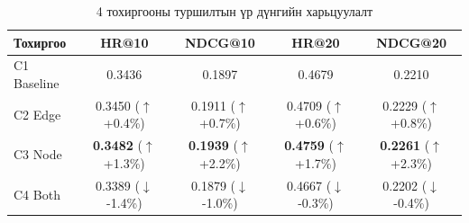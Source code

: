 \begin{table}[h]
\centering
\caption{4 тохиргооны туршилтын үр дүнгийн харьцуулалт}
\label{tab:results}
\begin{tabular}{lcccc}
\toprule
\textbf{Тохиргоо} & \textbf{HR@10} & \textbf{NDCG@10} & \textbf{HR@20} & \textbf{NDCG@20} \\
\midrule
C1 Baseline & 0.3436 & 0.1897 & 0.4679 & 0.2210 \\
C2 Edge & 0.3450 ($\uparrow$+0.4\%) & 0.1911 ($\uparrow$+0.7\%) & 0.4709 ($\uparrow$+0.6\%) & 0.2229 ($\uparrow$+0.8\%) \\
C3 Node & \textbf{0.3482} ($\uparrow$+1.3\%) & \textbf{0.1939} ($\uparrow$+2.2\%) & \textbf{0.4759} ($\uparrow$+1.7\%) & \textbf{0.2261} ($\uparrow$+2.3\%) \\
C4 Both & 0.3389 ($\downarrow$-1.4\%) & 0.1879 ($\downarrow$-1.0\%) & 0.4667 ($\downarrow$-0.3\%) & 0.2202 ($\downarrow$-0.4\%) \\
\bottomrule
\end{tabular}
\end{table}